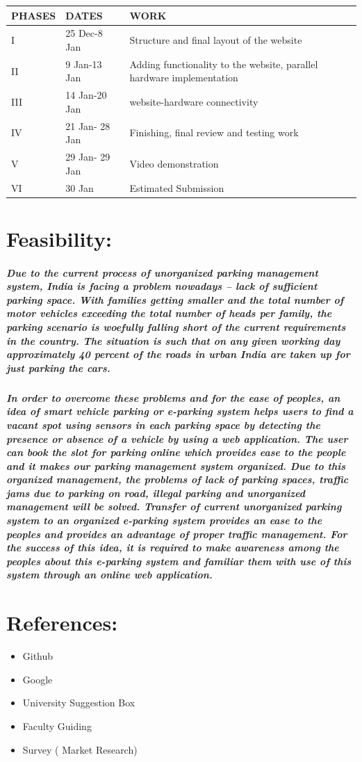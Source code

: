 \documentclass[]{article}
\begin{document}
    \begin{center}
    \begin{tabular}{|l|l|l|}
\hline
 PHASES & DATES & WORK \\
\hline
I & 25 Dec-8 Jan & Structure and final layout of the website \\
\hline
II & 9 Jan-13 Jan & Adding functionality to the website, parallel hardware implementation \\ 
\hline
III & 14 Jan-20 Jan & website-hardware connectivity \\
\hline
IV & 21 Jan- 28 Jan & Finishing, final review and testing work \\
\hline
V & 29 Jan- 29 Jan & Video demonstration \\
\hline
VI & 30 Jan & Estimated Submission \\
\hline
    \end{tabular}
    \end{center}
    
\section{Feasibility:}
\subparagraph{Due to the current process of unorganized parking management system, India is facing a problem nowadays – lack of sufficient parking space. With families getting smaller and the total number of motor vehicles exceeding the total number of heads per family, the parking scenario is woefully falling short of the current requirements in the country. The situation is such that on any given working day approximately 40 percent of the roads in urban India are taken up for just parking the cars.}
\subparagraph{In order to overcome these problems and for the ease of peoples, an idea of smart vehicle parking or e-parking system helps users to find a vacant spot using sensors in each parking space by detecting the presence or absence of a vehicle by using a web application. The user can book the slot for parking online which provides ease to the people and it makes our parking management system organized. Due to this organized management, the problems of lack of parking spaces, traffic jams due to parking on road, illegal parking and unorganized management will be solved. Transfer of current unorganized parking system to an organized e-parking system provides an ease to the peoples and provides an advantage of proper traffic management. For the success of this idea, it is required to make awareness among the peoples about this e-parking system and familiar them with use of this system through an online web application.}

\section{References:}
\begin{itemize}
	\item Github
	\item Google
	\item University Suggestion Box
	\item Faculty Guiding
	\item Survey ( Market Research)
\end{itemize}
\end{document}
